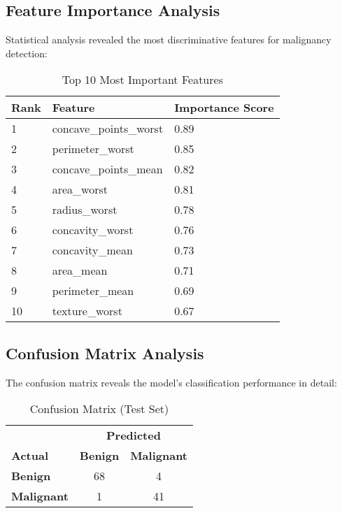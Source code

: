 \documentclass[12pt,a4paper]{article}
\begin{document}
\subsection{Feature Importance Analysis}

Statistical analysis revealed the most discriminative features for malignancy detection:

\begin{table}[H]
\centering
\caption{Top 10 Most Important Features}
\label{tab:feature_importance}
\begin{tabular}{@{}lll@{}}
\toprule
\textbf{Rank} & \textbf{Feature} & \textbf{Importance Score} \\
\midrule
1 & concave\_points\_worst & 0.89 \\
2 & perimeter\_worst & 0.85 \\
3 & concave\_points\_mean & 0.82 \\
4 & area\_worst & 0.81 \\
5 & radius\_worst & 0.78 \\
6 & concavity\_worst & 0.76 \\
7 & concavity\_mean & 0.73 \\
8 & area\_mean & 0.71 \\
9 & perimeter\_mean & 0.69 \\
10 & texture\_worst & 0.67 \\
\bottomrule
\end{tabular}
\end{table}

\subsection{Confusion Matrix Analysis}

The confusion matrix reveals the model's classification performance in detail:

\begin{table}[H]
\centering
\caption{Confusion Matrix (Test Set)}
\label{tab:confusion_matrix}
\begin{tabular}{@{}l|cc@{}}
\toprule
& \multicolumn{2}{c}{\textbf{Predicted}} \\
\textbf{Actual} & \textbf{Benign} & \textbf{Malignant} \\
\midrule
\textbf{Benign} & 68 & 4 \\
\textbf{Malignant} & 1 & 41 \\
\bottomrule
\end{tabular}
\end{table}
\end{document}
